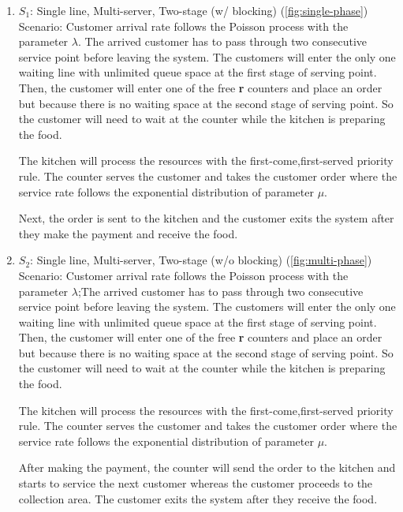 \begin{enumerate}[label=\roman*)]
    \item $S_1$: Single line, Multi-server, Two-stage (w/ blocking) (\autoref{fig:single-phase}) \\
          Scenario: Customer arrival rate follows the Poisson process with the parameter $\lambda$. The arrived customer has to pass through two consecutive service point before leaving the system. The customers will enter the only one waiting line with unlimited queue space at the first stage of serving point.
          Then, the customer will enter one of the free \textbf{r} counters and place an order but because there is no waiting space at the second stage of serving point. So the customer will need to wait at the counter while the kitchen is preparing the food.

          The kitchen will process the resources with the first-come,first-served priority rule. The counter serves the customer and takes the customer order where the service rate follows the exponential distribution of parameter $\mu$.

          Next, the order is sent to the kitchen and the customer exits the system after they make the payment and receive the food.

    \item $S_2$: Single line, Multi-server, Two-stage (w/o blocking) (\autoref{fig:multi-phase}) \\
          Scenario: Customer arrival rate follows the Poisson process with the parameter $\lambda$;The arrived customer has to pass through two consecutive service point before leaving the system. The customers will enter the only one waiting line with unlimited queue space at the first stage of serving point.
          Then, the customer will enter one of the free \textbf{r} counters and place an order but because there is no waiting space at the second stage of serving point. So the customer will need to wait at the counter while the kitchen is preparing the food.

          The kitchen will process the resources with the first-come,first-served priority rule. The counter serves the customer and takes the customer order where the service rate follows the exponential distribution of parameter $\mu$.

          After making the payment, the counter will send the order to the kitchen and starts to service the next customer whereas the customer proceeds to the collection area. The customer exits the system after they receive the food.
\end{enumerate}

